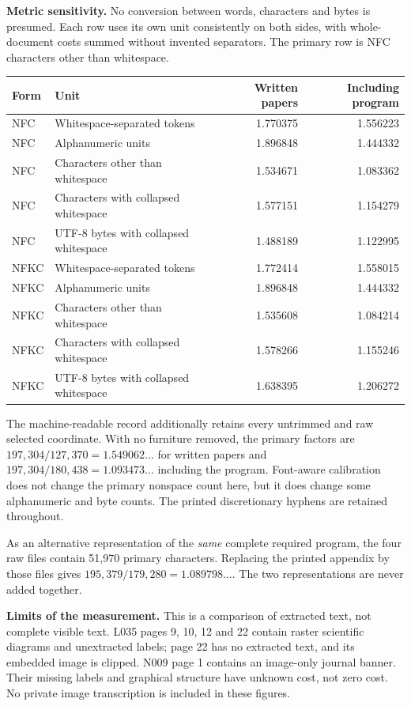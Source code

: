 \documentclass[11pt,a4paper]{article}
\begin{document}
\newpage
\noindent\textbf{Metric sensitivity.}
No conversion between words, characters and bytes is presumed. Each row
uses its own unit consistently on both sides, with whole-document costs
summed without invented separators. The primary row is NFC characters
other than whitespace.
\begin{center}\small
\begin{tabular}{llrr}\toprule
Form & Unit & Written papers & Including program\\\midrule
NFC & Whitespace-separated tokens & 1.770375 & 1.556223\\
NFC & Alphanumeric units & 1.896848 & 1.444332\\
NFC & Characters other than whitespace & 1.534671 & 1.083362\\
NFC & Characters with collapsed whitespace & 1.577151 & 1.154279\\
NFC & UTF-8 bytes with collapsed whitespace & 1.488189 & 1.122995\\\midrule
NFKC & Whitespace-separated tokens & 1.772414 & 1.558015\\
NFKC & Alphanumeric units & 1.896848 & 1.444332\\
NFKC & Characters other than whitespace & 1.535608 & 1.084214\\
NFKC & Characters with collapsed whitespace & 1.578266 & 1.155246\\
NFKC & UTF-8 bytes with collapsed whitespace & 1.638395 & 1.206272\\\bottomrule
\end{tabular}\end{center}
The machine-readable record additionally retains every untrimmed and raw
selected coordinate. With no furniture removed, the primary factors are
$197{,}304/127{,}370=1.549062\ldots$ for written papers and
$197{,}304/180{,}438=1.093473\ldots$ including the program. Font-aware
calibration does not change the primary nonspace count here, but it does
change some alphanumeric and byte counts. The printed discretionary
hyphens are retained throughout.

As an alternative representation of the \emph{same} complete required
program, the four raw files contain 51,970 primary characters. Replacing
the printed appendix by those files gives $195{,}379/179{,}280
=1.089798\ldots$. The two representations are never added together.

\medskip\noindent\textbf{Limits of the measurement.}
This is a comparison of extracted text, not complete visible text. L035
pages 9, 10, 12 and 22 contain raster scientific diagrams and unextracted
labels; page 22 has no extracted text, and its embedded image is clipped.
N009 page 1 contains an image-only journal banner. Their missing labels and
graphical structure have unknown cost, not zero cost. No private image
transcription is included in these figures.
\end{document}
